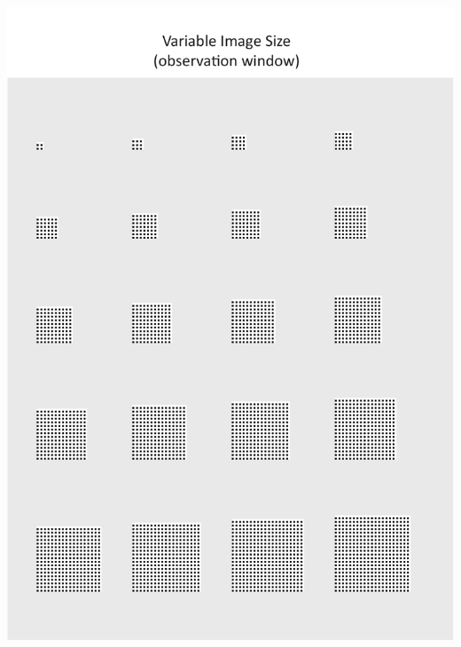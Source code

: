 \documentclass[
  12pt,
  a4paper, twoside]{book}
\begin{document}
\begin{center}\includegraphics[width=1\linewidth]{Appendix/size_obs} \end{center}

\newpage
\end{document}
